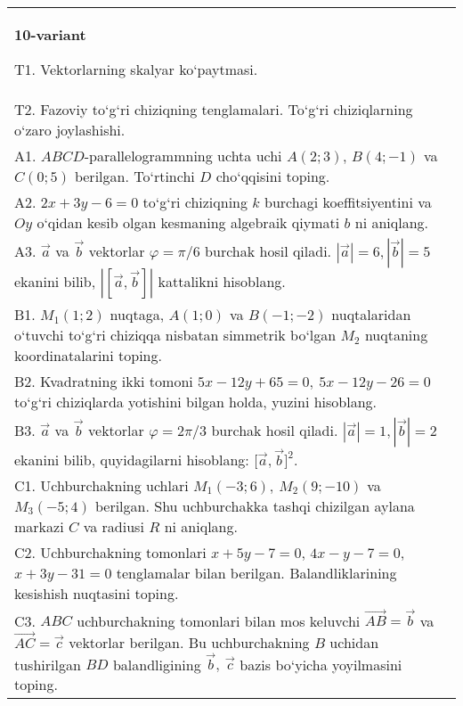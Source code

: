 \documentclass{article}
\begin{document}
\begin{tabular}{m{17cm}}
\textbf{10-variant}
\newline

T1. 
Vektorlarning skalyar ko‘paytmasi.
 \\
T2. 
Fazoviy to‘g‘ri chiziqning tenglamalari. To‘g‘ri chiziqlarning o‘zaro joylashishi.
 \\
A1. 
$ABCD$-parallelogrammning uchta uchi
$A (2;3) $, $B (4;-1) $ va $C (0;5) $ berilgan. To‘rtinchi $D$
cho‘qqisini toping.
 \\
A2. 
$2x+3y-6=0$ to‘g‘ri chiziqning $k$ burchagi
koeffitsiyentini va $Oy$ o‘qidan kesib olgan kesmaning algebraik
qiymati $b$ ni aniqlang.
 \\
A3. 
$\overrightarrow{a}$ va $\overrightarrow{b}$ vektorlar
$\varphi = \pi/6$ burchak hosil qiladi.
$|\overrightarrow{a}| = 6,|\overrightarrow{b}| = 5$ ekanini bilib,
$\left| \left\lbrack \overrightarrow{a},\overrightarrow{b} \right\rbrack \right|$ kattalikni hisoblang.
 \\
B1. 
\(M_{1} (1;2) \) nuqtaga, \(A (1;0) \) va \(B (-1;-2) \)
nuqtalaridan o‘tuvchi to‘g‘ri chiziqqa nisbatan simmetrik bo‘lgan \(M_{2}\) nuqtaning koordinatalarini toping.
 \\
B2. 
Kvadratning ikki tomoni
\(5x-12y+65=0,\ 5x-12y-26=0\) to‘g‘ri chiziqlarda
yotishini bilgan holda, yuzini hisoblang.
 \\
B3. 
$\vec{a}$ va $\vec{b}$ vektorlar $\varphi = 2\pi/3$ burchak hosil qiladi. $|\vec{a}| = 1,|\vec{b}| = 2$ ekanini bilib, quyidagilarni hisoblang:
$\lbrack\vec{a},\vec{b}\rbrack^{2}$.
 \\
C1. 
Uchburchakning uchlari \(M_{1} (- 3;6),\ M_{2} (9; - 10) \)
va \(M_{3} (-5;4) \) berilgan. Shu uchburchakka tashqi chizilgan
aylana markazi $C$ va radiusi $R$ ni aniqlang.
 \\
C2. 
Uchburchakning tomonlari \(x + 5y - 7 = 0\),
\(4x - y - 7 = 0\), \(x + 3y - 31 = 0\) tenglamalar bilan berilgan.
Balandliklarining kesishish nuqtasini toping.
 \\
C3. 
\(ABC\) uchburchakning tomonlari bilan mos keluvchi \(\vec{AB} = \vec{b}\) va \(\vec{AC} = \vec{c}\) vektorlar berilgan. Bu uchburchakning \(B\) uchidan tushirilgan \(BD\) balandligining \(\vec{b},\ \vec{c}\) bazis bo‘yicha yoyilmasini toping.
 \\

\end{tabular}
\vspace{1cm}
\end{document}
